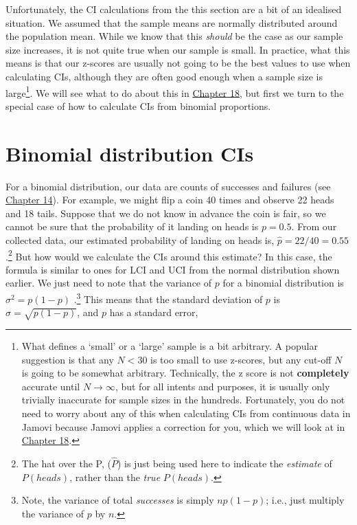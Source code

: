 \documentclass[
]{scrbook}
\begin{document}
Unfortunately, the CI calculations from the this section are a bit of an idealised situation.
We assumed that the sample means are normally distributed around the population mean.
While we know that this \emph{should} be the case as our sample size increases, it is not quite true when our sample is small.
In practice, what this means is that our z-scores are usually not going to be the best values to use when calculating CIs, although they are often good enough when a sample size is large\footnote{What defines a `small' or a `large' sample is a bit arbitrary. A popular suggestion \citep[e.g.,][ page 145]{Sokal1995} is that any \(N < 30\) is too small to use z-scores, but any cut-off \(N\) is going to be somewhat arbitrary. Technically, the z score is not \textbf{completely} accurate until \(N \to \infty\), but for all intents and purposes, it is usually only trivially inaccurate for sample sizes in the hundreds. Fortunately, you do not need to worry about any of this when calculating CIs from continuous data in Jamovi because Jamovi applies a correction for you, which we will look at in \protect\hyperlink{Chapter_18}{Chapter 18}.}.
We will see what to do about this in \protect\hyperlink{Chapter_18}{Chapter 18}, but first we turn to the special case of how to calculate CIs from binomial proportions.

\hypertarget{binomial-distribution-cis}{%
\section{Binomial distribution CIs}\label{binomial-distribution-cis}}

For a binomial distribution, our data are counts of successes and failures (see \protect\hyperlink{Chapter_14}{Chapter 14}).
For example, we might flip a coin 40 times and observe 22 heads and 18 tails.
Suppose that we do not know in advance the coin is fair, so we cannot be sure that the probability of it landing on heads is \(p = 0.5\).
From our collected data, our estimated probability of landing on heads is, \(\hat{p} = 22/40 = 0.55\).\footnote{The hat over the P, (\(\hat{P}\)) is just being used here to indicate the \emph{estimate} of \(P(heads)\), rather than the \emph{true} \(P(heads)\).}
But how would we calculate the CIs around this estimate?
In this case, the formula is similar to ones for LCI and UCI from the normal distribution shown earlier.
We just need to note that the variance of \(p\) for a binomial distribution is \(\sigma^{2} = p\left(1 - p\right)\) \citep{Box1978, Sokal1995}.\footnote{Note, the variance of total \emph{successes} is simply \(np\left(1 - p\right)\); i.e., just multiply the variance of \(p\) by \(n\).}
This means that the standard deviation of \(p\) is \(\sigma = \sqrt{p\left(1 - p\right)}\), and \(p\) has a standard error,
\end{document}

